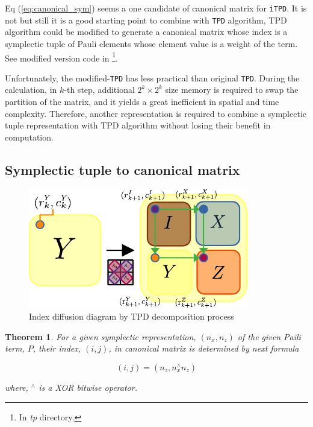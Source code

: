 \documentclass[twocolumn]{article}
\newtheorem{theorem}{Theorem}
\begin{document}
Eq (\ref{eq:canonical_sym}) seems a one candidate of canonical matrix 
for \texttt{iTPD}. It is not but still it is a good starting point to combine with \texttt{TPD} algorithm, 
TPD algorithm could be modified to generate a canonical matrix
whose index is a symplectic tuple of Pauli elements whose element value is a weight of the term.
See modified version code in \cite{kim_2024}\footnote{In \textit{tp} directory.}.

Unfortunately, the modified-\texttt{TPD} has less practical than 
original \texttt{TPD}.
During the calculation, in $k$-th step, additional $2^k \times 2^k$ size memory 
is required to swap the partition of the matrix, and it yields 
a great inefficient in spatial and time complexity.
Therefore, another representation is required to combine a symplectic tuple representation with
TPD algorithm without losing their benefit in computation.

\subsection{Symplectic tuple to canonical matrix}

\begin{figure}
    \includegraphics[width=\linewidth]{index_change_tpd.pdf}
    \caption{Index diffusion diagram by TPD decomposition process}
    \label{fig:index_change_tpd}
\end{figure}

\begin{theorem}
    \label{thm:index_conversion}
    For a given symplectic representation, $(n_x, n_z)$ of the given Paili term, $P$,
    their index, $(i, j)$, in canonical matrix is determined by next formula

    \begin{equation}
        \label{eq:ij_nznx}
        (i, j) = (n_z, n_x^\wedge n_z)
    \end{equation}

    where, ${}^\wedge$ is a XOR bitwise operator. 
\end{theorem}
\end{document}
